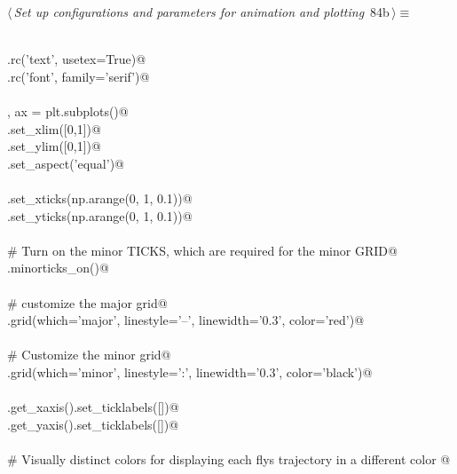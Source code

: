 \documentclass[11.5pt]{report}
\begin{document}
\vspace{-0.8cm} \newchunk 
\begin{flushleft} \small
\begin{minipage}{\linewidth}\label{scrap135}\raggedright\small
{} $\langle\,${\itshape Set up configurations and parameters for animation and plotting}\nobreak\ {\footnotesize {84b}}$\,\rangle\equiv$
\vspace{-1ex}
\begin{list}{}{} \item
\mbox{}\verb@@\\
\mbox{}\verb@plt.rc('text', usetex=True)@\\
\mbox{}\verb@plt.rc('font', family='serif')@\\
\mbox{}\verb@@\\
\mbox{}\verb@fig, ax = plt.subplots()@\\
\mbox{}\verb@ax.set_xlim([0,1])@\\
\mbox{}\verb@ax.set_ylim([0,1])@\\
\mbox{}\verb@ax.set_aspect('equal')@\\
\mbox{}\verb@@\\
\mbox{}\verb@ax.set_xticks(np.arange(0, 1, 0.1))@\\
\mbox{}\verb@ax.set_yticks(np.arange(0, 1, 0.1))@\\
\mbox{}\verb@@\\
\mbox{}\verb@# Turn on the minor TICKS, which are required for the minor GRID@\\
\mbox{}\verb@ax.minorticks_on()@\\
\mbox{}\verb@@\\
\mbox{}\verb@# customize the major grid@\\
\mbox{}\verb@ax.grid(which='major', linestyle='--', linewidth='0.3', color='red')@\\
\mbox{}\verb@@\\
\mbox{}\verb@# Customize the minor grid@\\
\mbox{}\verb@ax.grid(which='minor', linestyle=':', linewidth='0.3', color='black')@\\
\mbox{}\verb@@\\
\mbox{}\verb@ax.get_xaxis().set_ticklabels([])@\\
\mbox{}\verb@ax.get_yaxis().set_ticklabels([])@\\
\mbox{}\verb@@\\
\mbox{}\verb@# Visually distinct colors for displaying each flys trajectory in a different color @\\

\end{list}
\end{minipage}
\end{flushleft}
\end{document}
